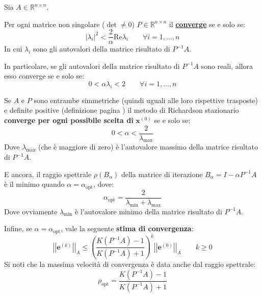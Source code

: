\begin{definitionbox}
    Sia $A \in \mathbb{R}^{n \times n}$.

    Per ogni matrice non singolare ($\det \ne 0$) $P \in \mathbb{R}^{n \times n}$ il  \underline{\textbf{converge}} se e solo se:
    \begin{equation*}
        \left| \lambda_{i} \right|^{2} < \dfrac{2}{\alpha} \mathrm{Re}\lambda_{i} \hspace{2em} \forall i = 1, \dots, n
    \end{equation*}
    In cui $\lambda_{i}$ sono gli autovalori della matrice risultato di $P^{-1} A$.

    \highspace
    In particolare, se gli autovalori della matrice risultato di $P^{-1} A$ sono reali, allora esso converge se e solo se:
    \begin{equation*}
        0 < \alpha \lambda_{i} < 2 \hspace{2em} \forall i = 1, \dots, n
    \end{equation*}

    \highspace
    Se $A$ e $P$ sono entrambe simmetriche (quindi uguali alle loro rispettive trasposte) e definite positive (definizione pagina \pageref{matrice definita positiva}) il metodo di Richardson stazionario \textbf{converge per ogni possibile scelta di} $\mathbf{x}^{\left(0\right)}$ se e solo se:
    \begin{equation*}
        0 < \alpha < \dfrac{2}{\lambda_{\max}}
    \end{equation*}
    Dove $\lambda_{\max}$ (che è maggiore di zero) è l'autovalore massimo della matrice risultato di $P^{-1} A$.

    \highspace
    E ancora, il raggio spettrale $\rho\left(B_{\alpha}\right)$ della matrice di iterazione $B_{\alpha} = I - \alpha P^{-1}A$ è il minimo quando $\alpha = \alpha_{\text{opt}}$, dove:
    \begin{equation}
        \alpha_{\text{opt}} = \dfrac{2}{\lambda_{\min} + \lambda_{\max}}
    \end{equation}
    Dove ovviamente $\lambda_{\min}$ è l'autovalore minimo della matrice risultato di $P^{-1} A$.

    \highspace
    Infine, se $\alpha = \alpha_{\text{opt}}$, vale la seguente \textbf{stima di convergenza}:
    \begin{equation}
        \left|\left| \mathbf{e}^{\left(k\right)} \right|\right|_{A} \le \left(
            \dfrac{K \left(P^{-1}A\right)-1}{K \left(P^{-1}A\right)+1}
        \right)^{k}
        \left|\left| \mathbf{e}^{\left(0\right)} \right|\right|_{A}
        \hspace{2em} k \ge 0
    \end{equation}
    Si noti che la massima velocità di convergenza è data anche dal raggio spettrale:
    \begin{equation}
        \rho_{\text{opt}} = \dfrac{K \left(P^{-1}A\right)-1}{K \left(P^{-1}A\right)+1}
    \end{equation}
\end{definitionbox}


